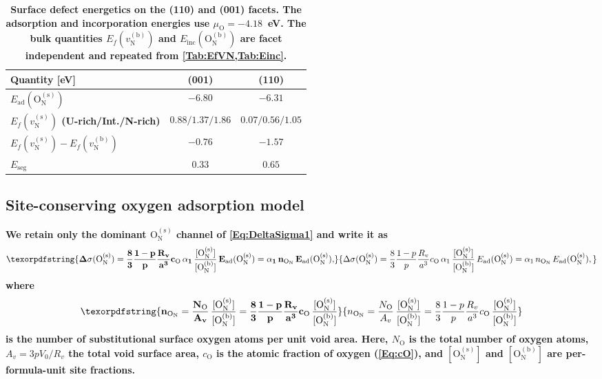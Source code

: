 \documentclass[preprint,12pt,sort&compress]{elsarticle}
\newcommand{\?}{\stackrel{?}{=}}
\providecommand{\DIFaddtex}[1]{{\bf #1}} %
\providecommand{\DIFaddFL}[1]{\DIFadd{#1}} %
\providecommand{\DIFadd}[1]{\texorpdfstring{\DIFaddtex{#1}}{#1}} %
\begin{document}
\begin{table}[h!]
\centering
\footnotesize
\caption{\DIFaddFL{Surface defect energetics on the (110) and (001) facets. The adsorption and incorporation energies use $\mu_\text{O}=-4.18$~eV. The bulk quantities $E_f(v_\text{N}^{(\text{b})})$ and $E_\text{inc}(\text{O}_\text{N}^{(\text{b})})$ are facet independent and repeated from \cref{Tab:EfVN,Tab:Einc}.}}
\begin{tabular}{lcc}
\hline
\DIFaddFL{Quantity }[\DIFaddFL{eV}] & \DIFaddFL{(001) }& \DIFaddFL{(110) }\\
\hline
\DIFaddFL{$E_\text{ad}(\text{O}_\text{N}^{(\text{s})})$               }& \DIFaddFL{$-6.80$ }& \DIFaddFL{$-6.31$ }\\
\DIFaddFL{$E_f(v_\text{N}^{(\text{s})})$ (U-rich/Int./N-rich)         }& \DIFaddFL{$0.88/1.37/1.86$ }& \DIFaddFL{$0.07/0.56/1.05$ }\\
\DIFaddFL{$E_f(v_\text{N}^{(\text{s})})-E_f(v_\text{N}^{(\text{b})})$ }& \DIFaddFL{$-0.76$ }& \DIFaddFL{$-1.57$ }\\
\DIFaddFL{$E_\text{seg}$                                              }& \DIFaddFL{$0.33$  }& \DIFaddFL{$0.65$ }\\
\hline
\end{tabular}
\label{Tab:110:defE}
\end{table}

\subsection{\DIFadd{Site-conserving oxygen adsorption model}}
\label{App:110:model}

\DIFadd{We retain only the dominant $\text{O}_\text{N}^{(\text{s})}$ channel of \cref{Eq:DeltaSigma1} and write it as
}\begin{equation}
\DIFadd{\Delta\sigma(\text{O}_\text{N}^{(\text{s})}) = \frac{8}{3} \frac{1-p}{p} \frac{R_v}{a^3} c_\text{O} \, \alpha_1 \,
\frac{[\text{O}_\text{N}^{(\text{s})}]}{[\text{O}_\text{N}^{(\text{b})}]} \,
E_\text{ad}(\text{O}_\text{N}^{(\text{s})}) = \alpha_1 \, n_{\text{O}_\text{N}} \, E_\text{ad}(\text{O}_\text{N}^{(\text{s})}),
\label{Eq:110:ON}
}\end{equation}
\DIFadd{where
}\begin{equation}
\DIFadd{n_{\text{O}_\text{N}} = \frac{N_\text{O}}{A_v} \, \frac{[\text{O}_\text{N}^{(\text{s})}]}{[\text{O}_\text{N}^{(\text{b})}]}
= \frac{8}{3} \frac{1-p}{p} \frac{R_v}{a^3}c_\text{O} \,
\frac{[\text{O}_\text{N}^{(\text{s})}]}{[\text{O}_\text{N}^{(\text{b})}]}
\label{Eq:110:nON}
}\end{equation}
\DIFadd{is the number of substitutional surface oxygen atoms per unit void area. Here, $N_\text{O}$ is the total number of oxygen atoms, $A_v = 3pV_0/R_v$ the total void surface area, $c_\text{O}$ is the atomic fraction of oxygen (\cref{Eq:cO}), and $[\text{O}_\text{N}^{(\text{s})}]$ and $[\text{O}_\text{N}^{(\text{b})}]$ are per-formula-unit site fractions.
}
\end{document}
